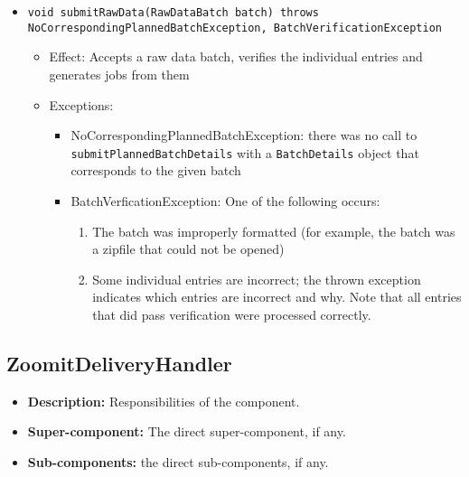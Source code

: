 \begin{itemize}
\begin{itemize}
    	\item \texttt{void submitRawData(RawDataBatch batch) throws NoCorrespondingPlannedBatchException, BatchVerificationException}
    	\begin{itemize}
    		\item Effect: Accepts a raw data batch, verifies the individual entries and generates jobs from them
    		\item Exceptions:
    		\begin{itemize}
    			\item NoCorrespondingPlannedBatchException: there was no call to \texttt{submitPlannedBatchDetails} with a \texttt{BatchDetails} object that corresponds to the given batch
    			\item BatchVerficationException: One of the following occurs:
    			\begin{enumerate}
    				\item The batch was improperly formatted (for example, the batch was a zipfile that could not be opened)
    				\item Some individual entries are incorrect; the thrown exception indicates which entries are incorrect and why. Note that all entries that did pass verification were processed correctly.
    			\end{enumerate} 
    		\end{itemize}
    	\end{itemize}
    \end{itemize}

\subsection{ZoomitDeliveryHandler}
\begin{itemize}
    \item \textbf{Description:} Responsibilities of the component.
    \item \textbf{Super-component:} The direct super-component, if any.
    \item \textbf{Sub-components:} the direct sub-components, if any.
\end{itemize}


\end{itemize}
